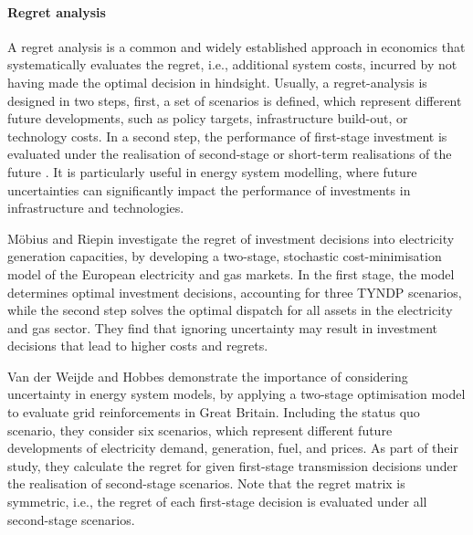 \documentclass[preprint,12pt,sort&compress]{elsarticle}
\begin{document}
\paragraph{Regret analysis}
A regret analysis is a common and widely established approach in economics that systematically evaluates the regret, i.e., additional system costs, incurred by not having made the optimal decision in hindsight. Usually, a regret-analysis is designed in two steps, first, a set of scenarios is defined, which represent different future developments, such as policy targets, infrastructure build-out, or technology costs. In a second step, the performance of first-stage investment is evaluated under the realisation of second-stage or short-term realisations of the future \cite{salvatoreManagerialEconomicPrinciples2008}. It is particularly useful in energy system modelling, where future uncertainties can significantly impact the performance of investments in infrastructure and technologies.

Möbius and Riepin \cite{mobiusRegretAnalysisInvestment2020} investigate the regret of investment decisions into electricity generation capacities, by developing a two-stage, stochastic cost-minimisation model of the European electricity and gas markets. In the first stage, the model determines optimal investment decisions, accounting for three TYNDP scenarios, while the second step solves the optimal dispatch for all assets in the electricity and gas sector. They find that ignoring uncertainty may result in investment decisions that lead to higher costs and regrets. 

Van der Weijde and Hobbes \cite{vanderweijdeEconomicsPlanningElectricity2012} demonstrate the importance of considering uncertainty in energy system models, by applying a two-stage optimisation model to evaluate grid reinforcements in Great Britain. Including the status quo scenario, they consider six scenarios, which represent different future developments of electricity demand, generation, fuel, and  prices. As part of their study, they calculate the regret for given first-stage transmission decisions under the realisation of second-stage scenarios. Note that the regret matrix is symmetric, i.e., the regret of each first-stage decision is evaluated under all second-stage scenarios. 
\end{document}
